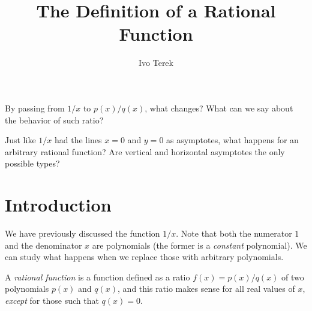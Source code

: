 \documentclass{ximera}
\author{Ivo Terek}
\title{The Definition of a Rational Function}
\begin{document}
\begin{abstract}
\end{abstract}
\maketitle



\begin{motivatingQuestions}
\item By passing from $1/x$ to $p(x)/q(x)$, what changes? What can we say about the behavior of such ratio?
\item Just like $1/x$ had the lines $x=0$ and $y=0$ as asymptotes, what happens for an arbitrary rational function? Are vertical and horizontal asymptotes the only possible types?
\end{motivatingQuestions}



\section{Introduction}

We have previously discussed the function $1/x$. Note that both the numerator $1$ and the denominator $x$ are polynomials (the former is a \emph{constant} polynomial). We can study what happens when we replace those with arbitrary polynomials.

\begin{definition}
  A \emph{rational function} is a function defined as a ratio $f(x) = p(x)/q(x)$ of two polynomials $p(x)$ and $q(x)$, and this ratio makes sense for all real values of $x$, \emph{except} for those such that $q(x) = 0$.
\end{definition}
\end{document}
